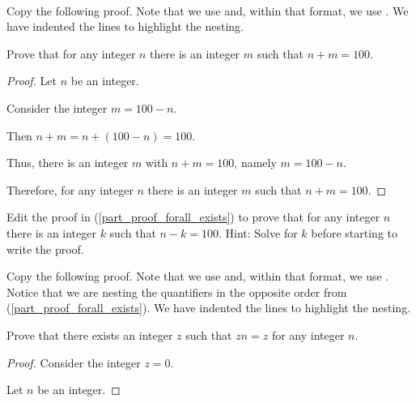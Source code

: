 \begin{act}
\label{act_proof_quants_nested} 
~
    \begin{actpart}
        \item \label{part_proof_forall_exists} Copy the following proof. Note that we use  and, within that format, we use . We have indented the lines to highlight the nesting.

        Prove that for any integer $n$ there is an integer $m$ such that $n+m=100.$
        
            \begin{proof}
                Let $n$ be an integer.  
                
                \hspace{.75in} Consider the integer $m=100-n$. 
                
                \hspace{.75in}\hspace{.75in} Then $n+m=n+(100-n)=100.$ 
                
                \hspace{.75in} Thus, there is an integer $m$ with $n+m=100$, namely $m=100-n$.  
                
                Therefore, for any integer $n$ there is an integer $m$ such that $n+m=100.$         
            \end{proof}

        \item Edit the proof in (\ref{part_proof_forall_exists}) to prove that for any integer $n$ there is an integer $k$ such that $n-k=100$.  Hint: Solve for $k$ before starting to write the proof.

        \item \label{part_proof_exists_forall} Copy the following proof. Note that we use  and, within that format, we use . Notice that we are nesting the quantifiers in the opposite order from (\ref{part_proof_forall_exists}). We have indented the lines to highlight the nesting.

        Prove that there exists an integer $z$ such that $zn=z$ for any integer $n$.
       
            \begin{proof}
                Consider the integer $z=0$.  
                
                \hspace{.75in} Let $n$ be an integer. 
                

\end{proof}
\end{actpart}
\end{act}
